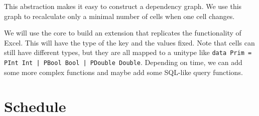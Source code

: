\documentclass{article}
\begin{document}
	This abstraction makes it easy to construct a dependency graph. We use this graph to recalculate only a minimal number of cells when one cell changes.
	
	We will use the core to build an extension that replicates the functionality of Excel. This will have the type of the key and the values fixed. Note that cells can still have different types, but they are all mapped to a unitype like \texttt{data Prim = PInt Int | PBool Bool | PDouble Double}. Depending on time, we can add some more complex functions and maybe add some SQL-like query functions.
	
	\section{Schedule}
\end{document}
